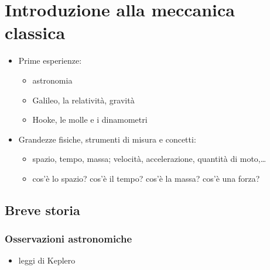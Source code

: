 \documentclass[letterpaper,10pt,italian]{jupyterBook}
\begin{document}
\chapter{Introduzione alla meccanica classica}
\label{\detokenize{ch/mechanics/intro:introduzione-alla-meccanica-classica}}\label{\detokenize{ch/mechanics/intro:physics-hs-mechanics-intro}}\label{\detokenize{ch/mechanics/intro::doc}}\begin{itemize}
\item {} 
\sphinxAtStartPar
Prime esperienze:
\begin{itemize}
\item {} 
\sphinxAtStartPar
astronomia

\item {} 
\sphinxAtStartPar
Galileo, la relatività, gravità

\item {} 
\sphinxAtStartPar
Hooke, le molle e i dinamometri

\end{itemize}

\item {} 
\sphinxAtStartPar
Grandezze fisiche, strumenti di misura e concetti:
\begin{itemize}
\item {} 
\sphinxAtStartPar
spazio, tempo, massa; velocità, accelerazione, quantità di moto,…

\item {} 
\sphinxAtStartPar
cos’è lo spazio? cos’è il tempo? cos’è la massa? cos’è una forza?

\end{itemize}

\end{itemize}


\section{Breve storia}
\label{\detokenize{ch/mechanics/intro:breve-storia}}

\subsection{Osservazioni astronomiche}
\label{\detokenize{ch/mechanics/intro:osservazioni-astronomiche}}\begin{itemize}
\item {} 
\sphinxAtStartPar
leggi di Keplero

\end{itemize}
\end{document}
